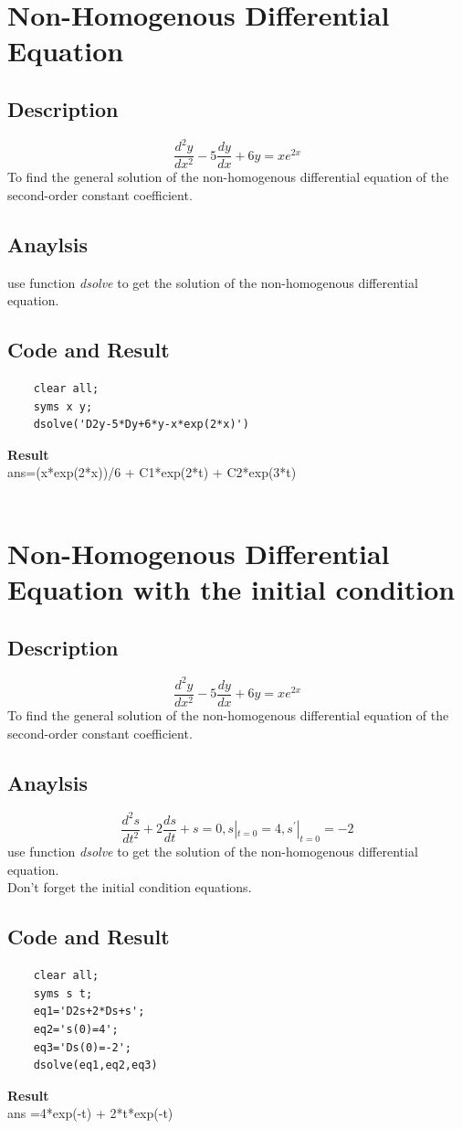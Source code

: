 \documentclass[UTF8,a4paper]{article}
\begin{document}
\section{Non-Homogenous Differential Equation}
\subsection{Description}
$$
\frac{d^2y}{dx^2}-5\frac{dy}{dx}+6y=xe^{2x}
$$
\noindent To find the general solution of the non-homogenous differential equation of the second-order constant coefficient.
\subsection{Anaylsis}
\noindent use function \textit{dsolve} to get the solution of the non-homogenous differential equation.\\

\subsection{Code and Result}
\begin{lstlisting}
    clear all;
    syms x y;
    dsolve('D2y-5*Dy+6*y-x*exp(2*x)')    
\end{lstlisting}
\textbf{Result}\\
ans=(x*exp(2*x))/6 + C1*exp(2*t) + C2*exp(3*t)\\\\
\section{Non-Homogenous Differential Equation with the initial condition}
\subsection{Description}
$$
\frac{d^2y}{dx^2}-5\frac{dy}{dx}+6y=xe^{2x}
$$
\noindent To find the general solution of the non-homogenous differential equation of the second-order constant coefficient.
\subsection{Anaylsis}
$$
\frac{d^2s}{dt^2}+2\frac{ds}{dt}+s=0,s|_{t=0}=4,s^{'}|_{t=0}=-2
$$
\noindent use function \textit{dsolve} to get the solution of the non-homogenous differential equation.\\
Don't forget the initial condition equations.
\subsection{Code and Result}
\begin{lstlisting}
    clear all;
    syms s t;
    eq1='D2s+2*Ds+s';
    eq2='s(0)=4';
    eq3='Ds(0)=-2';
    dsolve(eq1,eq2,eq3)      
\end{lstlisting}
\textbf{Result}\\
ans =4*exp(-t) + 2*t*exp(-t)\\\\
\end{document}
